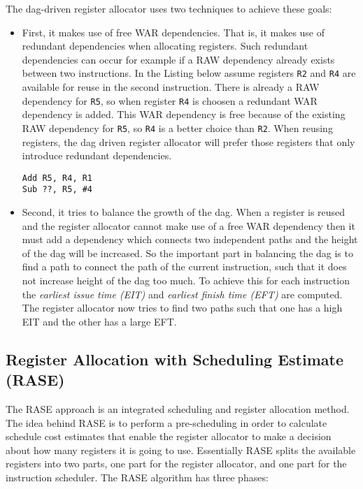 \documentclass[a4paper,10pt]{article}
\begin{document}
The dag-driven register allocator uses two techniques to achieve these goals:
 \begin{itemize}
  \item First, it makes use of free WAR dependencies. That is, it makes use of redundant dependencies when allocating registers. Such 
        redundant dependencies can occur for example if a RAW dependency already exists between two instructions. In the Listing below 
        assume registers \lstinline|R2| and \lstinline|R4| are available for reuse in the second instruction. There is already a RAW 
        dependency for \lstinline|R5|, so when register \lstinline|R4| is choosen a redundant WAR dependency is added. This WAR 
        dependency is free because of the existing RAW dependency for \lstinline|R5|, so \lstinline|R4| is a better choice than 
        \lstinline|R2|. When reusing registers, the dag driven register allocator will prefer those registers that only introduce redundant dependencies. 


\begin{lstlisting}[xleftmargin=3.5mm]
Add R5, R4, R1
Sub ??, R5, #4
\end{lstlisting}

  \item Second, it tries to balance the growth of the dag. When a register is reused and the register allocator cannot make use of a
        free WAR dependency then it must add a dependency which connects two independent paths and the height of the dag will be 
        increased. So the important part in balancing the dag is to find a path to connect the path of the current instruction, such that 
        it does not increase height of the dag too much. To achieve this for each instruction the \textit{earliest issue time (EIT)} and 
        \textit{earliest finish time (EFT)} are computed. The register allocator now tries to find two paths such that one has a high
        EIT and the other has a large EFT.
 \end{itemize}

\subsection{Register Allocation with Scheduling Estimate (RASE)}
The RASE approach is an integrated scheduling and register allocation method. The idea behind RASE is to perform a pre-scheduling in 
order to calculate schedule cost estimates that enable the register allocator to make a decision about how many registers it is going to 
use. Essentially RASE splits the available registers into two parts, one part for the register allocator, and one part for the 
instruction scheduler. The RASE algorithm has three phases:
\end{document}
